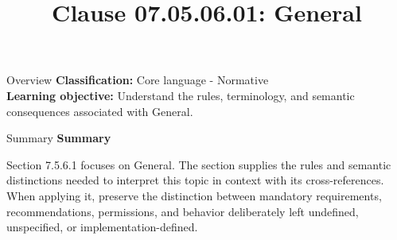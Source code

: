 \documentclass[10pt,letterpaper]{article}
\title{Clause 07.05.06.01: General}
\author{}
\date{}
\begin{document}
\maketitle
\begin{CornellOverviewBox}{Overview}
\textbf{Classification:} Core language - Normative\\[2pt]
\textbf{Learning objective:} Understand the rules, terminology, and semantic consequences associated with General.
\end{CornellOverviewBox}\begin{CornellSummaryBox}{Summary}
{\sffamily\bfseries\color{Accent} Summary}\par\vspace{3pt}Section 7.5.6.1 focuses on General. The section supplies the rules and semantic distinctions needed to interpret this topic in context with its cross-references. When applying it, preserve the distinction between mandatory requirements, recommendations, permissions, and behavior deliberately left undefined, unspecified, or implementation-defined.
\end{CornellSummaryBox}
\end{document}
